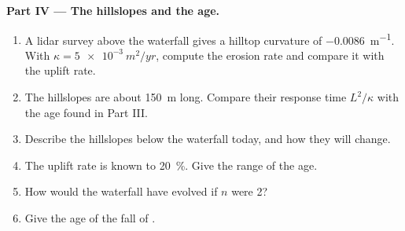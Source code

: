 \begin{problem}
\medskip\noindent\textbf{Part IV --- The hillslopes and the age.}
\begin{enumerate}[resume]
\item A lidar survey above the waterfall gives a hilltop curvature of
  \qty{-0.0086}{m^{-1}}. With $\kappa = \qty{5e-3}{m^2/yr}$, compute the
  erosion rate and compare it with the uplift rate.
\item The hillslopes are about \qty{150}{m} long. Compare their response
  time $L^2/\kappa$ with the age found in Part III.
\item Describe the hillslopes below the waterfall today, and how they will
  change.
\item The uplift rate is known to \qty{20}{\percent}. Give the range of the
  age.
\item How would the waterfall have evolved if $n$ were 2?
\item Give the age of the fall of .
\end{enumerate}
\end{problem}

